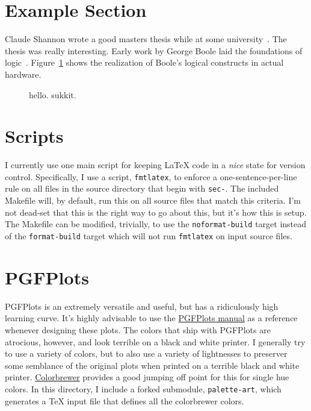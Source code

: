 \maketitle

\begin{abstract}
  Basic document that demonstrates the {\LaTeX} build flow that I use as well as several quirks regarding specific packages.
\end{abstract}

\section{Example Section}
Claude Shannon wrote a good masters thesis while at some university~\cite{shannon1938}.
The thesis was really interesting.
Early work by George Boole laid the foundations of logic~\missingcitation.
Figure~\ref{fig-shannon} shows the realization of Boole's logical constructs in actual hardware.

\begin{figure}[h]
  \caption{hello.
    sukkit.}
  \label{fig-shannon}
\end{figure}

\section{Scripts}
I currently use one main script for keeping {\LaTeX} code in a \emph{nice} state for version control.
Specifically, I use a script, \texttt{fmtlatex}, to enforce a one-sentence-per-line rule on all files in the source directory that begin with \texttt{sec-}.
The included Makefile will, by default, run this on all source files that match this criteria.
I'm not dead-set that this is the right way to go about this, but it's how this is setup.
The Makefile can be modified, trivially, to use the \texttt{noformat-build} target instead of the \texttt{format-build} target which will not run \texttt{fmtlatex} on input source files.

\section{PGFPlots}
PGFPlots is an extremely versatile and useful, but has a ridiculously high learning curve.
It's highly advisable to use the \href{http://mirrors.ctan.org/graphics/pgf/contrib/pgfplots/doc/pgfplots.pdf}{PGFPlots manual} as a reference whenever designing these plots.
The colors that ship with PGFPlots are atrocious, however, and look terrible on a black and white printer.
I generally try to use a variety of colors, but to also use a variety of lightnesses to preserver some semblance of the original plots when printed on a terrible black and white printer.
\href{http://colorbrewer2.org/}{Colorbrewer} provides a good jumping off point for this for single hue colors.
In this directory, I include a forked submodule, \texttt{palette-art}, which generates a {\TeX} input file that defines all the colorbrewer colors.

